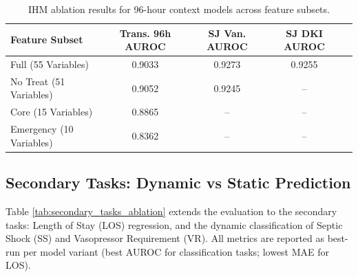 \begin{table}[ht]
\centering
\caption{IHM ablation results for 96-hour context models across feature subsets.}
\label{tab:saits_96h_ablation}
\begin{tabular}{lcccc}
\toprule
\textbf{Feature Subset} & \textbf{Trans. 96h AUROC} & \textbf{SJ Van. AUROC} & \textbf{SJ DKI AUROC} \\
\midrule
Full (55 Variables)     & 0.9033 & 0.9273 & 0.9255 \\
No Treat (51 Variables) & 0.9052 & 0.9245 & --     \\
Core (15 Variables)     & 0.8865 & --     & --     \\
Emergency (10 Variables)& 0.8362 & --     & --     \\
\bottomrule
\end{tabular}
\end{table}

\subsection{Secondary Tasks: Dynamic vs Static Prediction}

Table \ref{tab:secondary_tasks_ablation} extends the evaluation to the secondary tasks: Length of Stay (LOS) regression, and the dynamic classification of Septic Shock (SS) and Vasopressor Requirement (VR). All metrics are reported as best-run per model variant (best AUROC for classification tasks; lowest MAE for LOS).

\begin{table}[ht]
\centering
\caption{Benchmark results across secondary tasks (best run per variant). All models use the 24h baseline except where specified.}
\label{tab:secondary_tasks_ablation}
\end{table}
